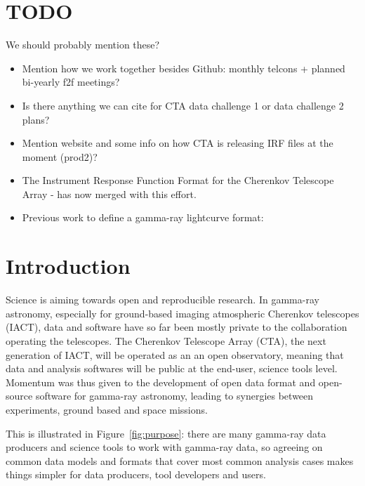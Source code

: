 \section{TODO}

We should probably mention these?

\begin{itemize}
    \item{} Mention how we work together besides Github: monthly telcons + planned bi-yearly f2f meetings?
    \item{} Is there anything we can cite for CTA data challenge 1 or data challenge 2 plans?
    \item{} Mention website and some info on how CTA is releasing IRF files at the moment (prod2)?
    \item{} The Instrument Response Function Format for the Cherenkov Telescope Array \cite{2015arXiv150807437W}
    - has now merged with this effort.
    \item{} Previous work to define a gamma-ray lightcurve format: \cite{2010AnA...524A..48T}
\end{itemize}

\section{Introduction}

Science is aiming towards open and reproducible research. In gamma-ray astronomy, especially for ground-based imaging atmospheric Cherenkov telescopes (IACT), data and software have so far been mostly private to the collaboration operating the telescopes. The Cherenkov Telescope Array (CTA), the next generation of IACT, will be operated as an an open observatory, meaning that data and analysis softwares will be public at the end-user, science tools level. Momentum was thus given to the development of open data format and open-source software for gamma-ray astronomy, leading to synergies between experiments, ground based and space missions.

This is illustrated in Figure~\ref{fig:purpose}: there are many gamma-ray data producers and science tools to work with gamma-ray data, so agreeing on common data models and formats that cover most common analysis cases makes things simpler for data producers, tool developers and users.

